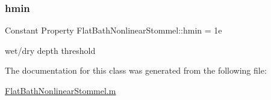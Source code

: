 \mbox{\label{class_flat_bath_nonlinear_stommel_a602de7927f85524c6a520e2d58d43e0e}} 
\subsubsection{\texorpdfstring{hmin}{hmin}}
{\footnotesize\ttfamily Constant Property Flat\+Bath\+Nonlinear\+Stommel\+::hmin = 1e}



wet/dry depth threshold 



The documentation for this class was generated from the following file\+:\begin{DoxyCompactItemize}
\item 
\hyperlink{_flat_bath_nonlinear_stommel_8m}{Flat\+Bath\+Nonlinear\+Stommel.\+m}\end{DoxyCompactItemize}
